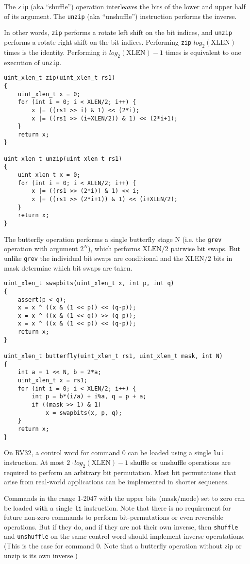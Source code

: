 The \texttt{zip} (aka ``shuffle'') operation interleaves the bits of the lower and upper
half of its argument. The \texttt{unzip} (aka ``unshuffle'') instruction performs the inverse.

In other words, \texttt{zip} performs a rotate left shift on the bit indices,
and \texttt{unzip} performs a rotate right shift on the bit indices.
Performing \texttt{zip} $log_2(\textrm{XLEN})$ times is the identity. Performing it
$log_2(\textrm{XLEN})-1$ times is equivalent to one execution of \texttt{unzip}.

\begin{verbatim}
uint_xlen_t zip(uint_xlen_t rs1)
{
    uint_xlen_t x = 0;
    for (int i = 0; i < XLEN/2; i++) {
        x |= ((rs1 >> i) & 1) << (2*i);
        x |= ((rs1 >> (i+XLEN/2)) & 1) << (2*i+1);
    }
    return x;
}

uint_xlen_t unzip(uint_xlen_t rs1)
{
    uint_xlen_t x = 0;
    for (int i = 0; i < XLEN/2; i++) {
        x |= ((rs1 >> (2*i)) & 1) << i;
        x |= ((rs1 >> (2*i+1)) & 1) << (i+XLEN/2);
    }
    return x;
}
\end{verbatim}

The butterfly operation performs a single butterfly stage N (i.e. the {\tt grev} operation
with argument $2^N$), which performs $\textrm{XLEN}/2$ pairwise bit swaps. But unlike
{\tt grev} the individual bit swaps are conditional and the $\textrm{XLEN}/2$
bits in mask determine which bit swaps are taken.

\begin{verbatim}
uint_xlen_t swapbits(uint_xlen_t x, int p, int q)
{
    assert(p < q);
    x = x ^ ((x & (1 << p)) << (q-p));
    x = x ^ ((x & (1 << q)) >> (q-p));
    x = x ^ ((x & (1 << p)) << (q-p));
    return x;
}

uint_xlen_t butterfly(uint_xlen_t rs1, uint_xlen_t mask, int N)
{
    int a = 1 << N, b = 2*a;
    uint_xlen_t x = rs1;
    for (int i = 0; i < XLEN/2; i++) {
        int p = b*(i/a) + i%a, q = p + a;
        if ((mask >> 1) & 1)
            x = swapbits(x, p, q);
    }
    return x;
}
\end{verbatim}

On RV32, a control word for command 0 can be loaded using a single \texttt{lui} instruction.
At most $2\cdot{}log_2(\textrm{XLEN})-1$ shuffle or unshuffle operations are required to
perform an arbitrary bit permutation. Most bit permutations that arise from real-world
applications can be implemented in shorter sequences.

Commands in the range 1-2047 with the upper bits (mask/mode) set to zero can be
loaded with a single \texttt{li} instruction. Note that there is no
requirement for future non-zero commands to perform bit-permutations or even
reversible operations. But if they do, and if they are not their own inverse,
then {\tt shuffle} and {\tt unshuffle} on the same control word should
implement inverse operatations. (This is the case for command $0$. Note that a
butterfly operation without zip or unzip is its own inverse.)

